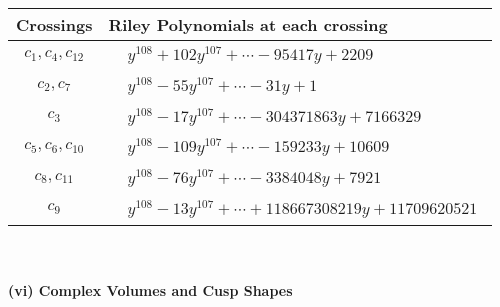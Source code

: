 \documentclass[1p]{elsarticle_modified}
\theoremstyle{definition}
\begin{document}
\begin{tabular}{m{50pt}|m{274pt}}
Crossings & \hspace{64pt}Riley Polynomials at each crossing \\
\hline $$\begin{aligned}c_{1},c_{4},c_{12}\end{aligned}$$&$\begin{aligned}
&y^{108}+102 y^{107}+\cdots-95417 y+2209
\end{aligned}$\\
\hline $$\begin{aligned}c_{2},c_{7}\end{aligned}$$&$\begin{aligned}
&y^{108}-55 y^{107}+\cdots-31 y+1
\end{aligned}$\\
\hline $$\begin{aligned}c_{3}\end{aligned}$$&$\begin{aligned}
&y^{108}-17 y^{107}+\cdots-304371863 y+7166329
\end{aligned}$\\
\hline $$\begin{aligned}c_{5},c_{6},c_{10}\end{aligned}$$&$\begin{aligned}
&y^{108}-109 y^{107}+\cdots-159233 y+10609
\end{aligned}$\\
\hline $$\begin{aligned}c_{8},c_{11}\end{aligned}$$&$\begin{aligned}
&y^{108}-76 y^{107}+\cdots-3384048 y+7921
\end{aligned}$\\
\hline $$\begin{aligned}c_{9}\end{aligned}$$&$\begin{aligned}
&y^{108}-13 y^{107}+\cdots+118667308219 y+11709620521
\end{aligned}$\\
\hline
\end{tabular}\\~\\
\newpage\flushleft \textbf{(vi) Complex Volumes and Cusp Shapes}
\end{document}
